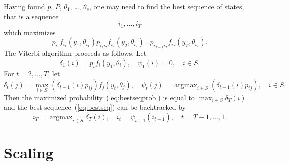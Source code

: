 \documentclass[a4paper,11pt]{article}
\DeclareMathOperator*{\argmax}{argmax}
\begin{document}
Having found $p$, $P$, $\theta_1$, \ldots, $\theta_s$, one may need to
find the best sequence of states, that is a sequence
\begin{equation} \label{eq:bestseq}
  i_1, \ldots, i_T
\end{equation}
which maximizes
\begin{equation} \label{eq:bestseqprob}
  p_{i_1}f_{i_1}(y_1, \theta_{i_1}) p_{i_1i_2}f_{i_2}(y_2, \theta_{i_2})
  \ldots p_{i_{T - 1}i_T}f_{i_T}(y_T, \theta_{i_T}).
\end{equation}
The Viterbi algorithm proceeds as follows. Let
\begin{displaymath}
  \delta_1(i) = p_i f_i(y_1, \theta_i), \hspace{1em} \psi_1(i) =
  0, \hspace{1em} i \in S.
\end{displaymath}
For $t = 2, \ldots, T$, let
\begin{displaymath}
  \delta_t(j) = \max_{i \in S} (\delta_{t - 1}(i) p_{ij}) f_j(y_t,
  \theta_j),
  \hspace{1em}
  \psi_t(j) = \argmax_{i \in S} (\delta_{t - 1}(i) p_{ij}),
  \hspace{1em} i \in S.
\end{displaymath}
Then the maximized probability~(\ref{eq:bestseqprob}) is equal to
$\max_{i \in S} \delta_T(i)$ and the best sequence~(\ref{eq:bestseq})
can be backtracked by
\begin{displaymath}
  i_T = \argmax_{i \in S} \delta_T(i),
  \hspace{1em}
  i_t = \psi_{t + 1}(i_{t + 1}), \hspace{1em} t = T - 1, \ldots, 1.
\end{displaymath}

\section{Scaling}
\end{document}
